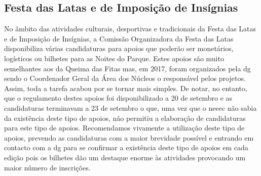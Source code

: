 
\subsection{Festa das Latas e de Imposição de Insígnias}

No âmbito das atividades culturais, desportivas e tradicionais da Festa das Latas e de Imposição de Insígnias, a Comissão Organizadora da Festa das Latas disponibiliza várias candidaturas para apoios que poderão ser monetários, logísticos ou bilhetes para as Noites do Parque. Estes apoios são muito semelhantes aos da Queima das Fitas mas, em 2017, foram organizados pela \acrshort{dg} sendo o Coordenador Geral da Área dos Núcleos o responsável pelos projetos. Assim, toda a tarefa acabou por se tornar mais simples. De notar, no entanto, que o regulamento destes apoios foi disponibilizado a 20 de setembro e as candidaturas terminavam a 23 de setembro o que, uma vez que o \acrshort{neeec} não sabia da existência deste tipo de apoios, não permitiu a elaboração de candidaturas para este tipo de apoios. Recomendamos vivamente a utilização deste tipo de apoios, prevendo as candidaturas com a maior brevidade possível e entrando em contacto com a \acrshort{dg} para se confirmar a existência deste tipo de apoios em cada edição pois os bilhetes dão um destaque enorme às atividades provocando um maior número de inscrições.